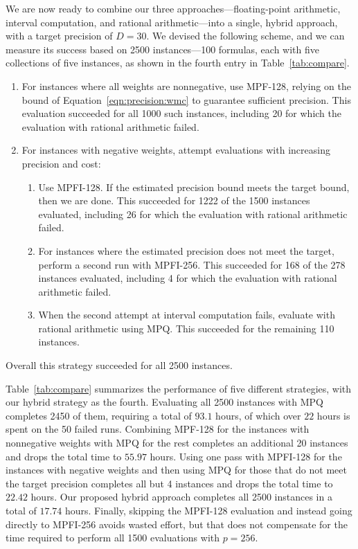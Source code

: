 \documentclass[
hf
]{ceurart}
\begin{document}
We are now ready to combine our three approaches---floating-point
arithmetic, interval computation, and rational arithmetic---into a
single, hybrid approach, with a target precision of $D=30$.  We devised the following scheme, and we can
measure its success based on 2500 instances---100 formulas, each with five collections of five instances, as shown in the fourth entry in Table~\ref{tab:compare}.
\begin{enumerate}
\item For instances where all weights are nonnegative, use MPF-128,
  relying on the bound of Equation~\ref{eqn:precision:wmc} to
  guarantee sufficient precision.  This evaluation succeeded for all 1000 such
  instances, including 20 for which the evaluation with rational arithmetic failed.
\item For instances with negative weights, attempt evaluations with increasing precision and cost:
\begin{enumerate}
\item 
  Use MPFI-128.  If the estimated precision
  bound meets the target bound, then we are done.  This succeeded for
  1222 of the 1500 instances evaluated, including 26 for which the evaluation with rational arithmetic failed.
\item For instances where the estimated precision does not meet the target, perform a second run with MPFI-256.  This succeeded
  for 168 of the 278 instances evaluated, including 4 for which the evaluation with rational arithmetic failed.
\item When the second attempt at interval computation fails, evaluate with rational arithmetic using MPQ\@.
This
  succeeded for the remaining 110 instances.
\end{enumerate}
\end{enumerate}
Overall this strategy succeeded for all 2500 instances.

Table~\ref{tab:compare} summarizes the performance of five different strategies, with our hybrid strategy as the fourth.
Evaluating all 2500
instances with MPQ completes
2450 of them, requiring a
total of $93.1$ hours, of which over 
$22$ hours is spent on the 50 failed runs.
Combining MPF-128 for the instances with nonnegative weights with MPQ for the rest
completes an
additional 20 instances and drops the total time to $55.97$ hours.
Using one pass with MPFI-128
for the instances with negative weights and then using MPQ for those
that do not meet the target precision completes all but 4 instances
and drops the total time to $22.42$ hours.
Our proposed hybrid approach completes all 2500 instances in a total of
$17.74$ hours.
Finally, skipping the MPFI-128 evaluation and instead going directly to MPFI-256 avoids
wasted effort, but that
does not
compensate for the time required to perform all 1500 evaluations 
with $p=256$.  
\end{document}
